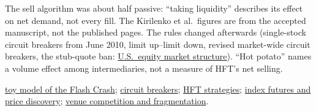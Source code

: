 \begin{qfevidence}
The sell algorithm was about half passive: ``taking liquidity'' describes its effect on net demand, not every fill. The Kirilenko et al.\ figures are from the accepted manuscript, not the published pages. The rules changed afterwards (single-stock circuit breakers from June 2010, limit up--limit down, revised market-wide circuit breakers, the stub-quote ban: \hyperref[rule:us-equity-market-structure]{U.S.\ equity market structure}). ``Hot potato'' names a volume effect among intermediaries, not a measure of HFT's net selling.

 \hyperref[mod:depth-overflow-flash-crash]{toy model of the Flash Crash}; \hyperref[mech:circuit-breakers-trading-halts]{circuit breakers}; \hyperref[def:hft-strategies]{HFT strategies}; \hyperref[ev:index-futures-price-discovery]{index futures and price discovery}; \hyperref[mech:venue-competition-fragmentation]{venue competition and fragmentation}.

\end{qfevidence}
